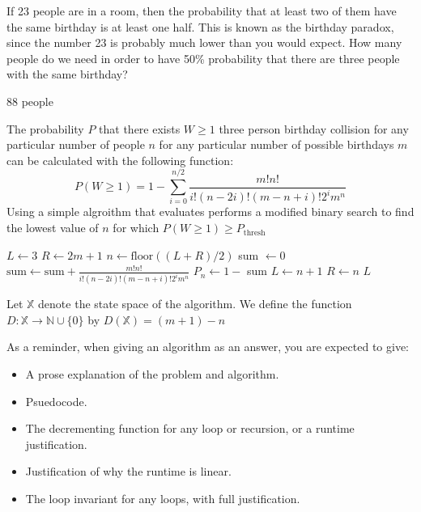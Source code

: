 \documentclass{article}
\author{Group: 7 Names: Peter Gifford, Kyle Brekke, Madison Henson, Ren Wall}
\date{due: 18 October 2019}
\begin{document}
\nextprob
If 23 people are in a room, then the probability that at least two of them have
the same birthday is at least one half.  This is known as the birthday paradox,
since the number 23 is probably much lower than you would expect.  How many
people do we need in order to have 50\% probability that there are three people
with the same birthday?

88 people

The probability $P$ that there exists $W \geq 1$ three person birthday collision for any particular number of people $n$ for any particular number of possible birthdays $m$ can be calculated with the following function:
$$P(W \geq 1) = 1 - \sum^{n/2}_{i=0} \frac{m!n!}{i!(n-2i)!(m-n+i)!2^i m^n }$$
Using a simple algroithm that evaluates performs a modified binary search to find the lowest value of $n$ for which    $P(W \geq 1) \geq  P_{\text{thresh}}$
    \begin{algorithm}
    \begin{algorithmic}
		\State $L \gets 3$		
		\State $R \gets 2m+1$
			\State $n \gets \text{floor}((L + R) / 2)$
			\State sum $\gets 0$
			\State $\text{sum} \gets \text{sum} \displaystyle + \frac{m!n!}{i!(n-2i)!(m-n+i)!2^i m^n }$
			\EndFor
			\State $ P_n \gets 1 - $ sum
				\State	$L \gets n + 1$
				\State $R \gets n$
			\EndIf
		\EndWhile
		\Return $L$
	\EndProcedure
	\end{algorithmic}
    \end{algorithm}
Let $\mathbb{X}$ denote the state space of the algorithm. We define the function $D: \mathbb{X} \to \mathbb{N} \cup \{0\}$ by $D(\mathbb{X}) = (m + 1) - n $

As a reminder, when giving an algorithm as an answer, you
are expected to give:
\begin{itemize}
    \item A prose explanation of the problem and algorithm.
    \item Psuedocode.
    \item The decrementing function for any loop or recursion, or a runtime
        justification.
    \item Justification of why the runtime is linear.
    \item The loop invariant for any loops, with full justification.
\end{itemize}
   
\end{document}
